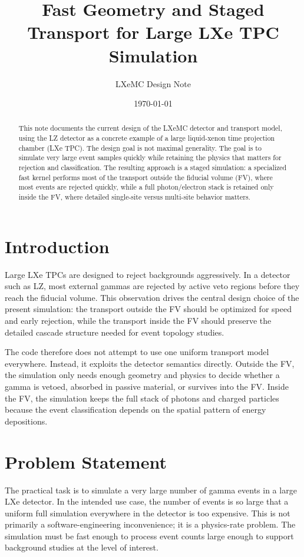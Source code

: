 \documentclass[11pt]{article}
\title{Fast Geometry and Staged Transport for Large LXe TPC Simulation}
\author{LXeMC Design Note}
\date{\today}
\begin{document}
\maketitle

\begin{abstract}
This note documents the current design of the LXeMC detector and transport
model, using the LZ detector as a concrete example of a large liquid-xenon
time projection chamber (LXe TPC). The design goal is not maximal generality.
The goal is to simulate very large event samples quickly while retaining the
physics that matters for rejection and classification. The resulting approach is
a staged simulation: a specialized fast kernel performs most of the transport
outside the fiducial volume (FV), where most events are rejected quickly, while
a full photon/electron stack is retained only inside the FV, where detailed
single-site versus multi-site behavior matters.
\end{abstract}

\section{Introduction}

Large LXe TPCs are designed to reject backgrounds aggressively. In a detector
such as LZ, most external gammas are rejected by active veto regions before they
reach the fiducial volume. This observation drives the central design choice of
the present simulation: the transport outside the FV should be optimized for
speed and early rejection, while the transport inside the FV should preserve the
detailed cascade structure needed for event topology studies.

The code therefore does not attempt to use one uniform transport model
everywhere. Instead, it exploits the detector semantics directly. Outside the
FV, the simulation only needs enough geometry and physics to decide whether a
gamma is vetoed, absorbed in passive material, or survives into the FV. Inside
the FV, the simulation keeps the full stack of photons and charged particles
because the event classification depends on the spatial pattern of energy
depositions.

\section{Problem Statement}

The practical task is to simulate a very large number of gamma events in a large
LXe detector. In the intended use case, the number of events is so large that a
uniform full simulation everywhere in the detector is too expensive. This is not
primarily a software-engineering inconvenience; it is a physics-rate problem.
The simulation must be fast enough to process event counts large enough to
support background studies at the level of interest.
\end{document}
